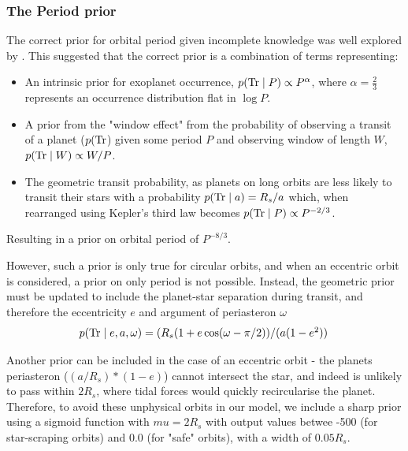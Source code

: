 \documentclass{article}
\begin{document}
\subsubsection{The Period prior}
The correct prior for orbital period given incomplete knowledge was well explored by \citet{Kipping2018}.
This suggested that the correct prior is a combination of terms representing:
\begin{itemize}
    \item An intrinsic prior for exoplanet occurrence, $p({\rm Tr} \mid P) \propto P^\alpha$, where $\alpha=\frac{2}{3}$ represents an occurrence distribution flat in $\log{P}$.
    \item A prior from the "window effect" from the probability of observing a transit of a planet ($p({\rm Tr}$) given some period $P$ and observing window of length $W$, $p({\rm Tr} \mid W) \propto W/P$.
    \item The geometric transit probability, as planets on long orbits are less likely to transit their stars with a probability $p({\rm Tr} \mid a) = R_s/a$ which, when rearranged using Kepler's third law becomes $p({\rm Tr} \mid P) \propto P^{-2/3}$.
\end{itemize}
Resulting in a prior on orbital period of $P^{-8/3}$.

However, such a prior is only true for circular orbits, and when an eccentric orbit is considered, a prior on only period is not possible.
Instead, the geometric prior must be updated to include the planet-star separation during transit, and therefore the eccentricity $e$ and argument of periasteron $\omega$
\begin{equation}
    $$ p({\rm Tr} \mid e,a,\omega) = (R_s (1+ e\cos(\omega-\pi/2)) /(a (1-e^2)) \; $$
\end{equation}

Another prior can be included in the case of an eccentric orbit - the planets periasteron ($(a/R_s)*(1 - e)$) cannot intersect the star, and indeed is unlikely to pass within $2R_s$, where tidal forces would quickly recircularise the planet.
Therefore, to avoid these unphysical orbits in our model, we include a sharp prior using a sigmoid function with $mu = 2R_s$ with output values betwee -500 (for star-scraping orbits) and 0.0 (for "safe" orbits), with a width of $0.05R_s$.
\end{document}
